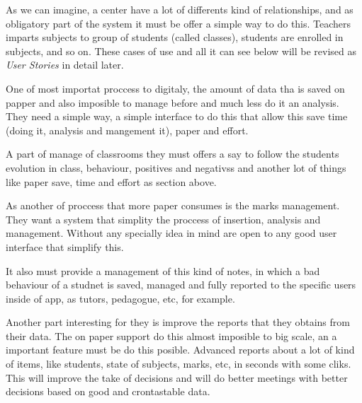 \documentclass[oneside,english,titlepage]{scrbook}
\begin{document}
\bigskip
{}
\bigskip

As we can imagine, a center have a lot of differents kind of relationships, and as obligatory part of the system it must be offer a simple way to do this. Teachers imparts subjects to group of students (called classes), students are enrolled in subjects, and so on. These cases of use and all it can see below will be revised as \textit{User Stories} in detail later.

\bigskip
{}
\bigskip

One of most importat proccess to digitaly, the amount of data tha is saved on papper and also imposible to manage before and much less do it an analysis.
They need a simple way, a simple interface to do this that allow this save time (doing it, analysis and mangement it), paper and effort. 


\bigskip
{}
\bigskip

A part of manage of classrooms they must offers a say to follow the students evolution in class, behaviour, positives and negativss and another lot of things like paper save, time and effort as section above.

\bigskip
{}
\bigskip

As another of proccess that more paper consumes is the marks management. They want a system that simplity the proccess of insertion, analysis and management. Without any specially idea in mind are open to any good user interface that simplify this.


\bigskip
{}
\bigskip

It also must provide a management of this kind of notes, in which a bad behaviour of a studnet is saved, managed and fully reported to the specific users inside of app, as tutors, pedagogue, etc, for example.

\bigskip
{}
\bigskip

Another part interesting for they is improve the reports that they obtains from their data. The on paper support do this almost imposible to big scale, an a important feature must be do this posible. Advanced reports about a lot of kind of items, like students, state of subjects, marks, etc, in seconds with some cliks.
This will improve the take of decisions and will do better meetings with better decisions based on good and crontastable data.

\bigskip
{}
\bigskip
\end{document}
